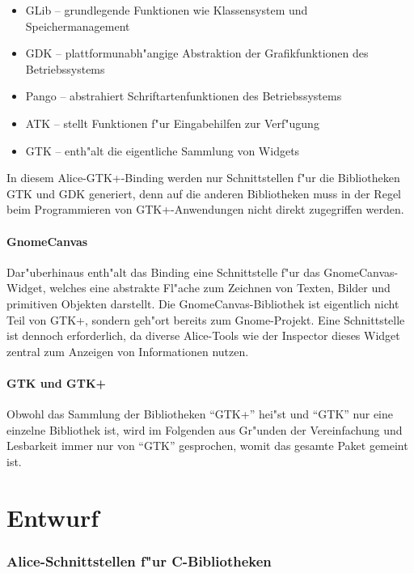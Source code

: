 \documentclass{article}
\begin{document}
\begin{itemize}
\item GLib -- grundlegende Funktionen wie Klassensystem und
      Speichermanagement
\item GDK -- plattformunabh"angige Abstraktion der Grafikfunktionen
      des Betriebssystems
\item Pango -- abstrahiert Schriftartenfunktionen des Betriebssystems
\item ATK -- stellt Funktionen f"ur Eingabehilfen zur Verf"ugung
\item GTK -- enth"alt die eigentliche Sammlung von Widgets
\end{itemize}

In diesem Alice-GTK+-Binding werden nur Schnittstellen f"ur die Bibliotheken
GTK und GDK generiert, denn auf die anderen Bibliotheken muss in der Regel beim
Programmieren von GTK+-Anwendungen nicht direkt zugegriffen werden.

\subsection*{GnomeCanvas}

Dar"uberhinaus enth"alt das Binding eine Schnittstelle f"ur das
GnomeCanvas-Widget, welches eine abstrakte
Fl"ache zum Zeichnen von Texten, Bilder und primitiven
Objekten darstellt. Die GnomeCanvas-Bibliothek ist eigentlich nicht Teil
von GTK+, sondern geh"ort bereits zum Gnome-Projekt. Eine Schnittstelle ist 
dennoch erforderlich, da diverse Alice-Tools
wie der Inspector dieses Widget zentral zum Anzeigen von Informationen
nutzen.

\subsection*{GTK und GTK+}

Obwohl das Sammlung der Bibliotheken ``GTK+'' hei"st und ``GTK'' nur eine
einzelne Bibliothek ist, wird im Folgenden aus Gr"unden der Vereinfachung
und Lesbarkeit immer nur von ``GTK'' gesprochen, womit das gesamte
Paket gemeint ist.


\part{Entwurf}

\section{Alice-Schnittstellen f"ur C-Bibliotheken}
\end{document}
